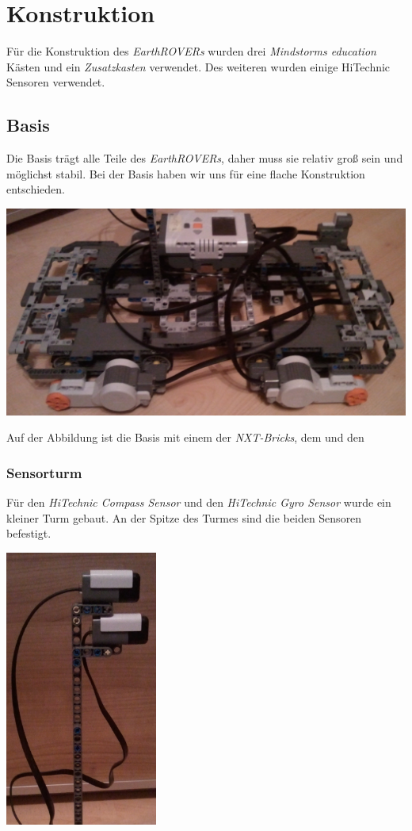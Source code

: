 \chapter{Konstruktion}
Für die Konstruktion des \textit{EarthROVERs} wurden drei \textit{Mindstorms education} Kästen und ein \textit{Zusatzkasten} verwendet. Des weiteren wurden einige HiTechnic Sensoren verwendet.

\section{Basis}
Die Basis trägt alle Teile des \textit{EarthROVERs}, daher muss sie relativ groß sein und möglichst stabil. Bei der Basis haben wir uns für eine flache Konstruktion entschieden.

\begin{capfigure}[Basis]
	\includegraphics[width=\textwidth]{images/construction/basis/basis}
\end{capfigure}

Auf der Abbildung ist die Basis mit einem der \textit{NXT-Bricks}, dem  und den  

\subsection{Sensorturm}
Für den \textit{HiTechnic Compass Sensor} und den \textit{HiTechnic Gyro Sensor} wurde ein kleiner Turm gebaut. An der Spitze des Turmes sind die beiden Sensoren befestigt.

\begin{capfigure}[Sensorturm]
	\includegraphics[width=5cm]{images/construction/basis/turm}
\end{capfigure}

